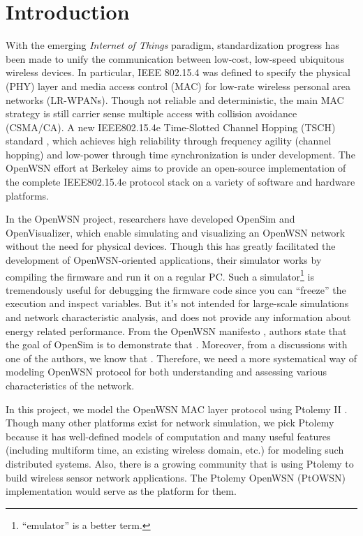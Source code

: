 \section{Introduction}
\label{sec:introduction}

With the emerging {\em Internet of Things} paradigm, standardization progress has been made to unify the communication between low-cost, low-speed ubiquitous wireless devices. In particular, IEEE 802.15.4 \cite{IEEE802.15.4} was defined to specify the physical (PHY) layer and media access control (MAC) for low-rate wireless personal area networks (LR-WPANs). Though not reliable and deterministic, the main MAC strategy is still carrier sense multiple access with collision avoidance (CSMA/CA). A new IEEE802.15.4e Time-Slotted Channel Hopping (TSCH) standard \cite{IEEE802.15.4e}, which achieves high reliability through frequency agility (channel hopping) and low-power through time synchronization is under development. The OpenWSN \cite{watteyne2012openwsn} effort at Berkeley aims to provide an open-source implementation of the complete IEEE802.15.4e protocol stack on a variety of software and hardware platforms. 

In the OpenWSN project, researchers have developed OpenSim and OpenVisualizer, which enable simulating and visualizing an OpenWSN network without the need for physical devices. Though this has greatly facilitated the development of OpenWSN-oriented applications, their simulator works by compiling the firmware and run it on a regular PC. Such a simulator\footnote{ ``emulator'' is a better term.} is tremendously useful for debugging the firmware code since you can ``freeze'' the execution and inspect variables. But it's not intended for large-scale simulations and network characteristic analysis, and does not provide any information about energy related performance. From the OpenWSN manifesto \cite{watteyne2012openwsn}, authors state that the goal of OpenSim is to demonstrate that . Moreover, from a discussions with one of the authors, we know that . Therefore, we need a more systematical way of modeling OpenWSN protocol for both understanding and assessing various characteristics of the network. 

In this project, we model the OpenWSN MAC layer protocol using Ptolemy II \cite{PtolemyVol1:04, davis1999overview}. Though many other platforms \cite{mccanne1995ns, varga2001omnet++} exist for network simulation, we pick Ptolemy because it has well-defined models of computation and many useful features (including multiform time, an existing wireless domain, etc.) for modeling such distributed systems. Also, there is a growing community that is using Ptolemy to build wireless sensor network applications. The Ptolemy OpenWSN (PtOWSN) implementation would serve as the platform for them. 


